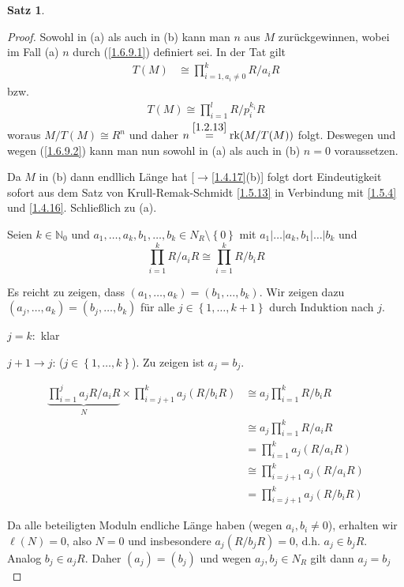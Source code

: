 \documentclass[
twoside=semi,
fontsize=12,
DIV=12, 
cleardoublepage=current,
leqno,
headings=optiontoheadandtoc, 
toc=idx
]{scrbook}
\newcommand{\N}{\mathbb{N}}
\newcommand{\set}[1]{\left\{ #1 \right\}}
\DeclareMathOperator{\rk}{rk}
\theoremstyle{definition}
\newtheorem{satz}[definition]{Satz}
\begin{document}
\begin{satz}
\begin{proof}
			\noindent Sowohl in (a) als auch in (b) kann man $n$ aus $M$ zur\"uckgewinnen, wobei im Fall (a) $n$ durch (\ref{1.6.9.1}) definiert sei. In der Tat gilt
			\begin{align}
				T(M) &\cong \prod_{i=1, a_i \neq 0}^k R/a_iR \label{1.6.9.2} \tag{$**$}
			\end{align}
			bzw. 
			\begin{align*}
				T(M) \cong \prod_{i=1}^l R/p_i^{k_i}R
			\end{align*}
			woraus $M/T(M) \cong R^n$ und daher $n \overset{\ref{1.2.13}}{=} \rk(M/T(M))$ folgt. Deswegen und wegen (\ref{1.6.9.2}) kann man nun sowohl in (a) als auch in (b) $n=0$ voraussetzen. 
			
			Da $M$ in (b) dann endllich L\"ange hat [$\to$\ref{1.4.17}(b)] folgt dort Eindeutigkeit sofort aus dem Satz von Krull-Remak-Schmidt \ref{1.5.13} in Verbindung mit \ref{1.5.4} und \ref{1.4.16}. Schlie\ss lich zu (a).
			
			Seien $k \in \N_0$ und $a_1, \dots, a_k, b_1, \dots, b_k \in N_R \setminus \set{0}$ mit $a_1|\dots|a_k, b_1|\dots|b_k$ und 
				\[\prod_{i=1}^k R/a_iR \cong \prod_{i=1}^kR/b_iR\]
				
			\noindent Es reicht zu zeigen, dass $(a_1, \dots, a_k) = (b_1, \dots, b_k)$. Wir zeigen dazu \linebreak $(a_j, \dots, a_k) = (b_j, \dots, b_k)$ f\"ur alle $j\in \set{1,\dots,k+1}$ durch Induktion nach $j$.
			
			$j=k:$ klar
			
			$j+1\to j$: ($j \in \set{1,\dots,k}$). Zu zeigen ist $a_j = b_j$. 
			
			\begin{align*}
				\underbrace{\prod_{i=1}^j a_jR/a_iR}_{N} \times \prod_{i=j+1}^k a_j(R/b_iR) &\cong a_j \prod_{i=1}^k R/b_iR\\
				&\cong a_j \prod_{i=1}^k R/a_iR\\
				&=\prod_{i=1}^k a_j(R/a_iR)\\
				&\cong \prod_{i=j+1}^k a_j(R/a_iR)\\
				&= \prod_{i=j+1}^k a_j(R/b_iR)
			\end{align*} 
		
			Da alle beteiligten Moduln endliche L\"ange haben (wegen $a_i, b_i \neq 0$), erhalten wir $\ell(N) = 0$, also $N=0$ und insbesondere $a_j(R/b_jR) = 0$, d.h. $a_j \in b_jR$. Analog $b_j \in a_jR$. Daher $(a_j) = (b_j)$ und wegen $a_j, b_j \in N_R$ gilt dann $a_j = b_j$
		\end{proof}
	\end{satz}
\end{document}
